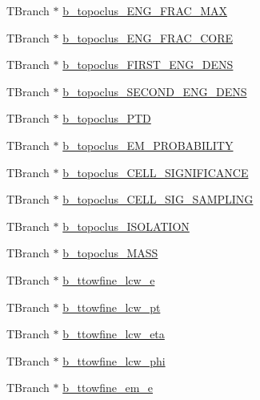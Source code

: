 \begin{DoxyCompactItemize}
\item 
T\+Branch $\ast$ \hyperlink{classXMLWriter_a8a0765dc982cf9c08a1c623c2e8ffd87}{b\+\_\+topoclus\+\_\+\+E\+N\+G\+\_\+\+F\+R\+A\+C\+\_\+\+M\+AX}
\item 
T\+Branch $\ast$ \hyperlink{classXMLWriter_ad0031821fd5cab578c5bf71067746b65}{b\+\_\+topoclus\+\_\+\+E\+N\+G\+\_\+\+F\+R\+A\+C\+\_\+\+C\+O\+RE}
\item 
T\+Branch $\ast$ \hyperlink{classXMLWriter_a58c578a92d0eee0d197cf11ce4a34d18}{b\+\_\+topoclus\+\_\+\+F\+I\+R\+S\+T\+\_\+\+E\+N\+G\+\_\+\+D\+E\+NS}
\item 
T\+Branch $\ast$ \hyperlink{classXMLWriter_aaa88962732d03977c897f13acc275e4a}{b\+\_\+topoclus\+\_\+\+S\+E\+C\+O\+N\+D\+\_\+\+E\+N\+G\+\_\+\+D\+E\+NS}
\item 
T\+Branch $\ast$ \hyperlink{classXMLWriter_a6c0642d7fd7df380be1041363a2afd82}{b\+\_\+topoclus\+\_\+\+P\+TD}
\item 
T\+Branch $\ast$ \hyperlink{classXMLWriter_ac827ef867f69dc150f93b263f03262ae}{b\+\_\+topoclus\+\_\+\+E\+M\+\_\+\+P\+R\+O\+B\+A\+B\+I\+L\+I\+TY}
\item 
T\+Branch $\ast$ \hyperlink{classXMLWriter_a804e33fb4daa144db2756cbf41cc47fd}{b\+\_\+topoclus\+\_\+\+C\+E\+L\+L\+\_\+\+S\+I\+G\+N\+I\+F\+I\+C\+A\+N\+CE}
\item 
T\+Branch $\ast$ \hyperlink{classXMLWriter_afc689f4154d95cc71a72f07a48583921}{b\+\_\+topoclus\+\_\+\+C\+E\+L\+L\+\_\+\+S\+I\+G\+\_\+\+S\+A\+M\+P\+L\+I\+NG}
\item 
T\+Branch $\ast$ \hyperlink{classXMLWriter_aea3daee9bc7730cd0854366d2b4fef9d}{b\+\_\+topoclus\+\_\+\+I\+S\+O\+L\+A\+T\+I\+ON}
\item 
T\+Branch $\ast$ \hyperlink{classXMLWriter_ae10aa99b3c3d1e1cfcf83a0f8b1d9ba1}{b\+\_\+topoclus\+\_\+\+M\+A\+SS}
\item 
T\+Branch $\ast$ \hyperlink{classXMLWriter_a8d01cef6dadad452fd5b7a8e2e1d091a}{b\+\_\+ttowfine\+\_\+lcw\+\_\+e}
\item 
T\+Branch $\ast$ \hyperlink{classXMLWriter_afa5ccd936fe3643c123e0c627b90782f}{b\+\_\+ttowfine\+\_\+lcw\+\_\+pt}
\item 
T\+Branch $\ast$ \hyperlink{classXMLWriter_a46a2bf39f38d827d7443d188f5a8edee}{b\+\_\+ttowfine\+\_\+lcw\+\_\+eta}
\item 
T\+Branch $\ast$ \hyperlink{classXMLWriter_a406be579273004b8221da5e9e7170034}{b\+\_\+ttowfine\+\_\+lcw\+\_\+phi}
\item 
T\+Branch $\ast$ \hyperlink{classXMLWriter_acff0444efded347cc12d23e396ab83ad}{b\+\_\+ttowfine\+\_\+em\+\_\+e}

\end{DoxyCompactItemize}

